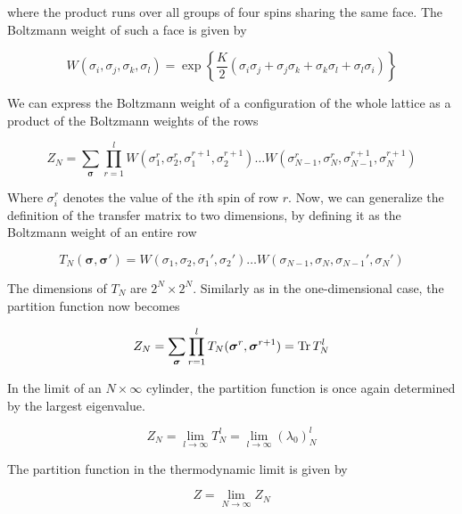 where the product runs over all groups of four spins sharing the same face. The Boltzmann weight of such a face is given by

\begin{equation}
  W(\sigma_i, \sigma_j, \sigma_k, \sigma_l) = \exp \left\{ \frac{K}{2} (\sigma_i \sigma_j + \sigma_j \sigma_k + \sigma_k \sigma_l + \sigma_l \sigma_i) \right\}
\end{equation}

We can express the Boltzmann weight of a configuration of the whole lattice as a product of the Boltzmann weights of the rows

\begin{equation}
  Z_N = \sum_{\bm{\sigma}} \prod_{r = 1}^{l} W(\sigma_{1}^{r}, \sigma_{2}^{r}, \sigma_{1}^{r+1}, \sigma_{2}^{r+1}) \dots W(\sigma_{N-1}^{r}, \sigma_{N}^{r}, \sigma_{N-1}^{r+1}, \sigma_{N}^{r+1})
\end{equation}

Where $\sigma_{i}^{r}$ denotes the value of the $i$th spin of row $r$. Now, we
can generalize the definition of the transfer matrix to two dimensions, by
defining it as the Boltzmann weight of an entire row

\begin{equation}\label{row_to_row_transfer_matrix} 
  T_{N}(\bm{\sigma}, \bm{\sigma'}) = W(\sigma_1, \sigma_2, \sigma_1', \sigma_2') \dots W(\sigma_{N-1}, \sigma_N, \sigma_{N-1}', \sigma_{N}')
\end{equation}

The dimensions of $T_N$ are $2^N \times 2^N$. Similarly as in the one-dimensional case, the partition function now becomes

\begin{equation}\label{z_n_times_infty}
  Z_N = \sum_{\bm{\sigma}} \prod_{r = 1}^{l} T_{N}(\bm{\sigma}^r, \bm{\sigma}^{r+1}) = \operatorname{Tr} T_{N}^l
\end{equation}

In the limit of an $N \times \infty$ cylinder, the partition function is once again determined by the largest eigenvalue.

\begin{equation}\label{largest_eigenvalue_transfer_matrix}
  Z_N = \lim_{l \to \infty} T_{N}^{l} = \lim_{l \to \infty} (\lambda_0)_{N}^{l}
\end{equation}

The partition function in the thermodynamic limit is given by

\begin{equation}
  Z = \lim_{N \to \infty} Z_N
\end{equation}




